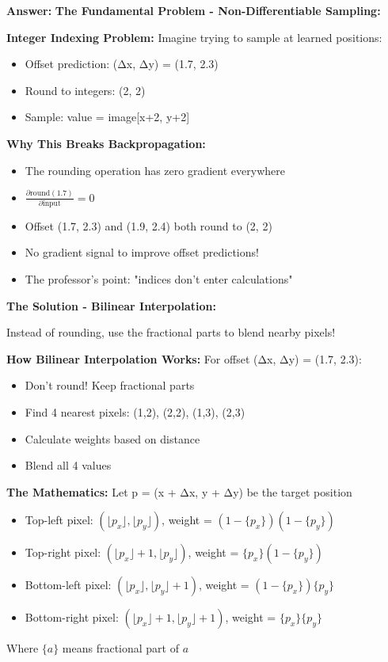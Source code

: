 \documentclass[12pt]{article}
\newcommand{\answer}[1]{{\color{answercolor}\textbf{Answer:} #1}}
\newcommand{\explanation}[1]{{\color{explanationcolor}#1}}
\begin{document}
\begin{enumerate}[(a)]
    \answer{
    \textbf{The Fundamental Problem - Non-Differentiable Sampling:}
    
    \explanation{
    \textbf{Integer Indexing Problem:}
    Imagine trying to sample at learned positions:
    \begin{itemize}
        \item Offset prediction: (Δx, Δy) = (1.7, 2.3)
        \item Round to integers: (2, 2)
        \item Sample: value = image[x+2, y+2]
    \end{itemize}
    
    \textbf{Why This Breaks Backpropagation:}
    \begin{itemize}
        \item The rounding operation has zero gradient everywhere
        \item $\frac{\partial \text{round}(1.7)}{\partial \text{input}} = 0$
        \item Offset (1.7, 2.3) and (1.9, 2.4) both round to (2, 2)
        \item No gradient signal to improve offset predictions!
        \item The professor's point: "indices don't enter calculations"
    \end{itemize}
    }
    
    \textbf{The Solution - Bilinear Interpolation:}
    
    \explanation{
    Instead of rounding, use the fractional parts to blend nearby pixels!
    
    \textbf{How Bilinear Interpolation Works:}
    For offset (Δx, Δy) = (1.7, 2.3):
    \begin{itemize}
        \item Don't round! Keep fractional parts
        \item Find 4 nearest pixels: (1,2), (2,2), (1,3), (2,3)
        \item Calculate weights based on distance
        \item Blend all 4 values
    \end{itemize}
    
    \textbf{The Mathematics:}
    Let p = (x + Δx, y + Δy) be the target position
    \begin{itemize}
        \item Top-left pixel: $(⌊p_x⌋, ⌊p_y⌋)$, weight = $(1-\{p_x\})(1-\{p_y\})$
        \item Top-right pixel: $(⌊p_x⌋+1, ⌊p_y⌋)$, weight = $\{p_x\}(1-\{p_y\})$
        \item Bottom-left pixel: $(⌊p_x⌋, ⌊p_y⌋+1)$, weight = $(1-\{p_x\})\{p_y\}$
        \item Bottom-right pixel: $(⌊p_x⌋+1, ⌊p_y⌋+1)$, weight = $\{p_x\}\{p_y\}$
    \end{itemize}
    Where $\{a\}$ means fractional part of $a$
    
}}
\end{enumerate}
\end{document}

